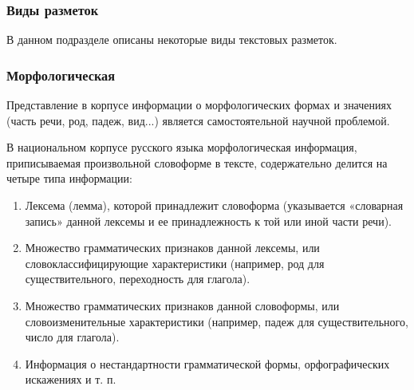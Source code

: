 \subsubsection{Виды разметок}

В данном подразделе описаны некоторые виды текстовых разметок.

\subsubsection*{Морфологическая}

Представление в корпусе информации о морфологических формах и значениях (часть речи, род, падеж, вид...) является самостоятельной научной проблемой. \cite{ruscorpora}

В национальном корпусе русского языка \cite{ruscorpora} морфологическая информация, приписываемая произвольной словоформе в тексте, содержательно делится на четыре типа информации:
\begin{enumerate}
    \item Лексема (лемма), которой принадлежит словоформа (указывается «словарная запись» данной лексемы и ее принадлежность к той или иной части речи).
    \item Множество грамматических признаков данной лексемы, или словоклассифицирующие характеристики (например, род для существительного, переходность для глагола).
    \item Множество грамматических признаков данной словоформы, или словоизменительные характеристики (например, падеж для существительного, число для глагола).
    \item Информация о нестандартности грамматической формы, орфографических искажениях и т. п.
\end{enumerate}

